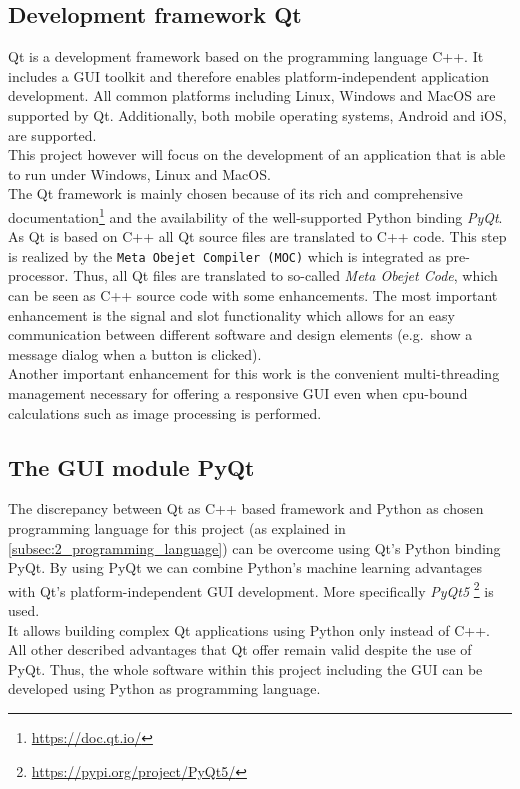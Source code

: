\subsection{Development framework Qt}\label{subsec:2_qt}
Qt is a development framework based on the programming language C++.
It includes a \ac{GUI} toolkit and therefore enables platform-independent
application development.
All common platforms including Linux, Windows and MacOS are supported by 
Qt.
Additionally, both mobile operating systems, Android and iOS, are supported.\\
This project however will focus on the development of an application that is 
able to run under Windows, Linux and MacOS.\\
The Qt framework is mainly chosen because of its rich and comprehensive 
documentation\footnote{\url{https://doc.qt.io/}} and the availability of the 
well-supported Python binding \textit{PyQt}.\\
As Qt is based on C++ all Qt source files are translated to C++ code.
This step is realized by the \texttt{Meta Obejet Compiler (MOC)} which is 
integrated as pre-processor.
Thus, all Qt files are translated to so-called \textit{Meta Obejet Code}, 
which can be seen as C++ source code with some enhancements.
The most important enhancement is the signal and slot functionality which 
allows for an easy communication between different software and design 
elements (e.g.\ show a message dialog when a button is clicked).\\
Another important enhancement for this work is the convenient multi-threading
management necessary for offering a responsive \ac{GUI} even when cpu-bound 
calculations such as image processing is performed.

\subsection*{The \acs*{GUI} module PyQt}\label{subsec:2_pyqt}
The discrepancy between Qt as C++ based framework and Python as chosen
programming language for this project (as explained in \autoref{subsec:2_programming_language})
can be overcome using Qt's Python binding PyQt.
By using PyQt we can combine Python's machine learning advantages with Qt's 
platform-independent \ac{GUI} development.
More specifically \textit{PyQt5} \footnote{\url{https://pypi.org/project/PyQt5/}} 
is used.\\
It allows building complex Qt applications using Python only instead of C++.
All other described advantages that Qt offer remain valid despite the use 
of PyQt.
Thus, the whole software within this project including the \ac{GUI} can be 
developed using Python as programming language.